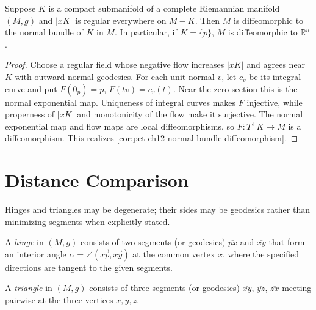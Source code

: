 \begin{corollary}
  \label{cor:pet-ch12-normal-bundle-diffeomorphism}
  Suppose $K$ is a compact submanifold of a complete Riemannian manifold $(M,g)$
  and $|xK|$ is regular everywhere on $M-K$. Then $M$ is diffeomorphic to the
  normal bundle of $K$ in $M$. In particular, if $K=\{p\}$, $M$ is diffeomorphic
  to $\mathbb{R}^n$.
\end{corollary}
\begin{proof}
  \sketch
  Choose a regular field whose negative flow increases $|xK|$ and agrees near
  $K$ with outward normal geodesics. For each unit normal $v$, let $c_v$ be its
  integral curve and put $F(0_p)=p$, $F(tv)=c_v(t)$. Near the zero section this
  is the normal exponential map. Uniqueness of integral curves makes $F$
  injective, while properness of $|xK|$ and monotonicity of the flow make it
  surjective. The normal exponential map and flow maps are local
  diffeomorphisms, so $F:T^+K\to M$ is a diffeomorphism.
  This realizes \cref{cor:pet-ch12-normal-bundle-diffeomorphism}.
\end{proof}

\section{Distance Comparison}

Hinges and triangles may be degenerate; their sides may be geodesics rather
than minimizing segments when explicitly stated.

\begin{definition}[hinge]
  \label{def:pet-ch12-hinge}
  A \emph{hinge} in $(M,g)$ consists of two segments (or geodesics)
  $\overline{px}$ and $\overline{xy}$ that form an interior angle
  $\alpha=\angle(\overrightarrow{xp},\overrightarrow{xy})$ at the common vertex
  $x$, where the specified directions are tangent to the given segments.
\end{definition}

\begin{definition}[triangle]
  \label{def:pet-ch12-triangle}
  A \emph{triangle} in $(M,g)$ consists of three segments (or geodesics)
  $\overline{xy}$, $\overline{yz}$, $\overline{zx}$ meeting pairwise at the three
  vertices $x,y,z$.
\end{definition}

